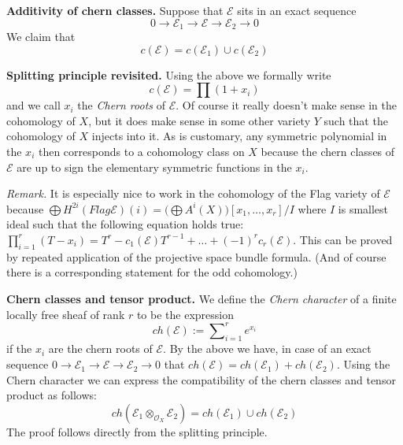 \medskip\noindent
{\bf Additivity of chern classes.} Suppose that ${\mathcal E}$ sits in an
exact sequence
$$
0
\to
{\mathcal E}_1
\to 
{\mathcal E}
\to 
{\mathcal E}_2
\to 
0
$$
We claim that
$$
c({\mathcal E}) = c({\mathcal E}_1) \cup c({\mathcal E}_2)
$$

\medskip\noindent
{\bf Splitting principle revisited.} Using the above
we formally write
$$
c({\mathcal E}) = \prod\nolimits (1+x_i)
$$
and we call $x_i$ the {\it Chern roots} of ${\mathcal E}$.
Of course it really doesn't make sense in the cohomology 
of $X$, but it does make sense in some other variety
$Y$ such that the cohomology of $X$ injects into it.
As is customary, any symmetric polynomial in the $x_i$
then corresponds to a cohomology class on $X$ because
the chern classes of ${\mathcal E}$ are up to sign the 
elementary symmetric functions in the $x_i$.

\medskip\noindent
{\it Remark.} It is especially nice to work in the
cohomology of the Flag variety of ${\mathcal E}$ because
$ \bigoplus H^{2i}(Flag{\mathcal E})(i) =
\big(\bigoplus A^{i}(X)\big) [x_1,\ldots,x_r]/I $
where $I$ is smallest ideal such that the following
equation holds true:
$ \prod_{i=1}^r (T - x_i) =  T^r - c_1({\mathcal E}) T^{r-1}+ \ldots
+ (-1)^r c_r({\mathcal E})$. This can be proved by repeated application
of the projective space bundle formula. (And of course there
is a corresponding statement for the odd cohomology.)

\medskip\noindent
{\bf Chern classes and tensor product.}
We define the {\it Chern character} of a finite locally free
sheaf of rank $r$ to be the expression
$$
ch({\mathcal E}) := \sum\nolimits_{i=1}^r e^{x_i}
$$
if the $x_i$ are the chern roots of ${\mathcal E}$. By the above
we have, in case of an exact sequence
$
0
\to
{\mathcal E}_1
\to 
{\mathcal E}
\to 
{\mathcal E}_2
\to 
0
$
that $ch({\mathcal E}) = ch({\mathcal E}_1) + ch({\mathcal E}_2)$. 
Using the Chern character we can express the compatibility
of the chern classes and tensor product as follows:
$$
ch({\mathcal E}_1 \otimes_{{\mathcal O}_X} {\mathcal E}_2) =
ch({\mathcal E}_1) \cup ch({\mathcal E}_2)
$$
The proof follows directly from the splitting principle.

